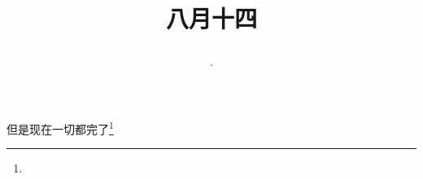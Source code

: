 \title{\date[d=16,m=9,y=2024][year:cn-y,年,month:cn,day:cn,日,·,weekday]·八月十四 }
但是现在一切都完了\footnote{ }

